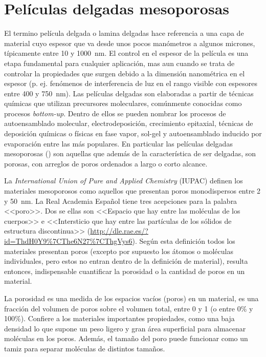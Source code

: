 \section{Películas delgadas mesoporosas}\label{sec:mesoporosos}
	
	 El termino película delgada o lamina delgadas hace referencia a una capa de material cuyo espesor que va desde unos pocos manómetros a algunos micrones, típicamente entre 10 y \SI{1000}{\nm}. El control en el espesor de la película es una etapa fundamental para cualquier aplicación, mas aun cuando se trata de controlar la propiedades que surgen debido a la dimensión nanométrica en el espesor (p. ej. fenómenos de interferencia de luz en el rango visible con espesores entre 400 y \SI{750}{\nm}). 
     Las películas delgadas son elaboradas a partir de técnicas químicas que utilizan precursores moleculares, comúnmente conocidas como procesos \textit{bottom-up}. Dentro de ellos se pueden nombrar los procesos de autoensamblado molecular, electrodeposición, crecimiento epitaxial, técnicas de deposición químicas o físicas en fase vapor, sol-gel y autoensamblado inducido por evaporación entre las más populares. En particular las películas delgadas mesoporosas (\pdm) son aquellas que además de la característica de ser delgadas, son porosas, con arreglos de poros ordenados a largo o corto alcance.

	 La \textit{International Union of Pure and Applied Chemistry} (IUPAC) definen los materiales mesoporosos como aquellos que presentan poros monodispersos entre 2 y \SI{50}{\nm}. La Real Academia Español tiene tres acepciones para la palabra <<poro>>. Dos se ellas son <<Espacio que hay entre las moléculas de los cuerpos>> e <<Intersticio que hay entre las partículas de los sólidos de estructura discontinua>> (\url{http://dle.rae.es/?id=ThdH0Y9%7CThe6N27%7CThgVys6}). Según esta definición todos los materiales presentan poros (excepto por supuesto los átomos o moléculas individuales, pero estos no entran dentro de la definición de material), resulta entonces, indispensable cuantificar la porosidad o la cantidad de poros en un material. 

	 \pagebreak La porosidad es una medida de los espacios vacíos (poros) en un material, es una fracción del volumen de poros sobre el volumen total, entre 0 y 1 (o entre 0\% y 100\%).\cite{iupac-1994} Confiere a los materiales importantes propiedades, como una baja densidad lo que supone un peso ligero y gran área superficial para almacenar moléculas en los poros. Además, el tamaño del poro puede funcionar como un tamiz para separar moléculas de distintos tamaños.\cite{Martin2004} 

